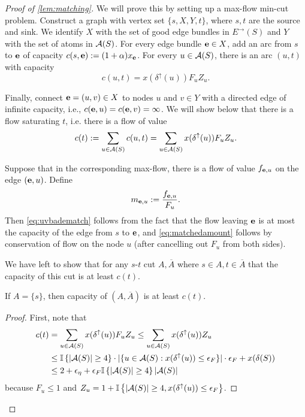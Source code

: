 \begin{proof}[Proof of \cref{lem:matching}]
	We will prove this by setting up a max-flow min-cut problem. 
	Construct a graph with vertex set $\{s,X,Y,t\}$, where $s,t$ are the source and sink. We identify $X$ with  the set of good edge bundles in $E^\rightarrow(S)$ and $Y$ with the set of atoms in ${\cal A}(S)$. For every edge bundle ${\bf e} \in X$, add an arc from $s$ to ${\bf e}$ of capacity $c(s,{\bf e}):= (1+\alpha) x_{\bf e}$.  For every $u\in {\cal A}(S)$, %
		there is an arc $(u,t)$ with capacity
		$$ c(u,t) = x(\delta^\uparrow(u))F_u Z_u.$$
		
Finally, connect ${\bf e}=(u,v)\in X$ to nodes $u$ and $v\in Y$ with a directed edge of infinite capacity, i.e., $c({\bf e},u)=c({\bf e},v)=\infty$.
We will show below that there is a flow saturating $t$, i.e. there is a flow of value 
$$c(t):=\sum_{u \in {\cal A}(S)} c(u,t) = \sum_{u\in {\cal A}(S)} x(\delta^\uparrow(u))F_uZ_u.   $$

Suppose that in the corresponding max-flow, there is a flow of value $f_{{\bf e},u}$ on the edge $({\bf e},u)$.
Define $$m_{{\bf e},u} := \frac{f_{{\bf e},u}}{F_u}.$$
Then \eqref{eq:uvbadematch} follows from the fact that the flow leaving ${\bf e}$ is at most the capacity of the edge from $s$ to ${\bf e}$, and \eqref{eq:matchedamount} follows by conservation of flow on the node $u$ (after cancelling out $F_u$ from both sides).



We have left to show that for any $s$-$t$ cut $A,\overline{A}$ where $s\in A, t\in \overline{A}$ that the capacity of this cut is at least $c(t)$.

\begin{claim} If $A=\{s\}$, then capacity of $(A,\overline{A})$ is at least $c(t)$.	
\end{claim}
\begin{proof}
First, note that 
\begin{align}
	c(t) &= \sum_{u \in {\cal A}(S)} x(\delta^\uparrow(u))F_uZ_u \le \sum_{u \in {\cal A}(S)} x(\delta^\uparrow(u))Z_u\nonumber \\ &\le {\mathbb{I}}\left\{|{\cal A}(S)| \ge 4\right\} \cdot |\{u \in {\cal A}(S): x(\delta^\uparrow(u)) \le {\epsilon}_F\}| \cdot {\epsilon}_F + x(\delta(S))\nonumber \\
	&\le 2+{\epsilon}_\eta + {\epsilon}_F{\mathbb{I}}\left\{|{\cal A}(S)| \ge 4\right\}|{\cal A}(S)| \label{eq:bound-ct}
\end{align}
because $F_u \le 1$ and $Z_u = 1 + {\mathbb{I}}\left\{|{\cal A}(S)| \ge 4,x(\delta^\uparrow(u)) \le {\epsilon}_F\right\}$. 


\end{proof}
\end{proof}
